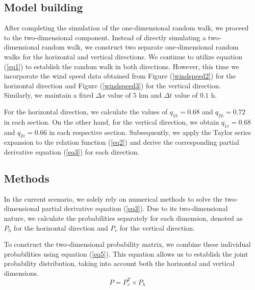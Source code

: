 \documentclass{article}
\begin{document}
\begin{multicols}{2}
\subsection{Model building}
After completing the simulation of the one-dimensional random walk, we proceed to the two-dimensional component. Instead of directly simulating a two-dimensional random walk, we construct two separate one-dimensional random walks for the horizontal and vertical directions. We continue to utilize equation (\ref{eq1}) to establish the random walk in both directions. However, this time we incorporate the wind speed data obtained from Figure (\ref{windspeed2}) for the horizontal direction and Figure (\ref{windspeed3}) for the vertical direction. Similarly, we maintain a fixed $\Delta x$ value of $5$ km and $\Delta t$ value of $0.1$ h.

For the horizontal direction, we calculate the values of $q_{1h} = 0.68$ and $q_{2h} = 0.72$ in each section. On the other hand, for the vertical direction, we obtain $q_{1v} = 0.68$ and $q_{2v} = 0.66$ in each respective section. Subsequently, we apply the Taylor series expansion to the relation function (\ref{eq2}) and derive the corresponding partial derivative equation (\ref{eq3}) for each direction.







\subsection{Methods}
In the current scenario, we solely rely on numerical methods to solve the two-dimensional partial derivative equation (\ref{eq3}). Due to its two-dimensional nature, we calculate the probabilities separately for each dimension, denoted as $P_h$ for the horizontal direction and $P_v$ for the vertical direction.

To construct the two-dimensional probability matrix, we combine these individual probabilities using equation (\ref{eq5}). This equation allows us to establish the joint probability distribution, taking into account both the horizontal and vertical dimensions.
\begin{equation}
P=P_v^{T}\times P_h
\label{eq5}
\end{equation}




\end{multicols}
\end{document}
